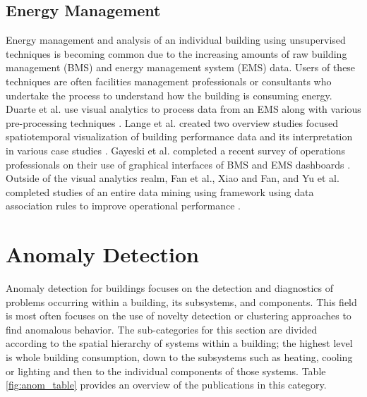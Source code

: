\documentclass[preprint,12pt,3p]{elsarticle}
\begin{document}
\subsection{Energy Management}
Energy management and analysis of an individual building using unsupervised techniques is becoming common due to the increasing amounts of raw building management (BMS) and energy management system (EMS) data. Users of these techniques are often facilities management professionals or consultants who undertake the process to understand how the building is consuming energy. Duarte et al. use visual analytics to process data from an EMS along with various pre-processing techniques \cite{duarte_prioritizing_2011}. Lange et al. created two overview studies focused spatiotemporal visualization of building performance data and its interpretation in various case studies \cite{lange_energy_2012,lange_discovering_2013}. Gayeski et al. completed a recent survey of operations professionals on their use of graphical interfaces of BMS and EMS dashboards \cite{gayeski_data_2015}. Outside of the visual analytics realm, Fan et al., Xiao and Fan, and Yu et al. completed studies of an entire data mining using framework using data association rules to improve operational performance \cite{fan_temporal_2015,xiao_data_2014,yu_extracting_2013}.

\section{Anomaly Detection}
\label{AnomalyDetection}
Anomaly detection for buildings focuses on the detection and diagnostics of problems occurring within a building, its subsystems, and components. This field is most often focuses on the use of novelty detection or clustering approaches to find anomalous behavior. The sub-categories for this section are divided according to the spatial hierarchy of systems within a building; the highest level is whole building consumption, down to the subsystems such as heating, cooling or lighting and then to the individual components of those systems. Table \ref{fig:anom_table} provides an overview of the publications in this category.
\end{document}
